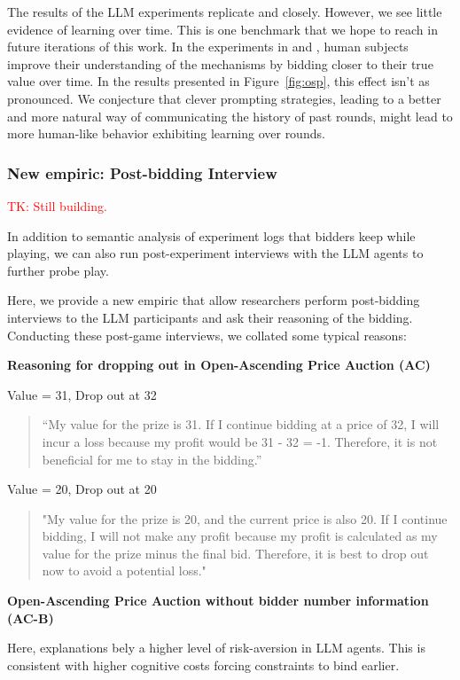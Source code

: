 \documentclass{article} %
\newcommand{\TK}[1]{\textcolor{red}{TK: #1}}
\begin{document}
The results of the LLM experiments replicate \cite{li2017obviously} and \citet{breitmoser2022obviousness} closely.
However, we see little evidence of learning over time. This is one benchmark that we hope to reach in future iterations of this work. 
In the experiments in \citet{li2017obviously} and \citet{breitmoser2022obviousness}, human subjects improve their understanding of the mechanisms by bidding closer to their true value over time. 
In the results presented in Figure~\ref{fig:osp}, this effect isn't as pronounced. 
We conjecture that clever prompting strategies, leading to a better and more natural way of communicating the history of past rounds, might lead to more human-like behavior exhibiting learning over rounds.

\subsubsection{New empiric: Post-bidding Interview}
\TK{Still building.}

In addition to semantic analysis of experiment logs that bidders keep while playing, we can also run post-experiment interviews with the LLM agents to further probe play.

Here, we provide a new empiric that allow researchers perform post-bidding interviews to the LLM participants and ask their reasoning of the bidding. 
Conducting these post-game interviews, we collated some typical reasons:

\textbf{Reasoning for dropping out in Open-Ascending Price Auction (AC)}


Value = 31, Drop out at 32
\begin{quote}
    “My value for the prize is 31. If I continue bidding at a price of 32, I will incur a loss because my profit would be 31 - 32 = -1. Therefore, it is not beneficial for me to stay in the bidding.”
\end{quote}

Value = 20, Drop out at 20
\begin{quote}
    "My value for the prize is 20, and the current price is also 20. If I continue bidding, I will not make any profit because my profit is calculated as my value for the prize minus the final bid. Therefore, it is best to drop out now to avoid a potential loss."
\end{quote}

\textbf{Open-Ascending Price Auction without bidder number information (AC-B)}

Here, explanations bely a higher level of risk-aversion in LLM agents. 
This is consistent with higher cognitive costs forcing constraints to bind earlier.
\end{document}
